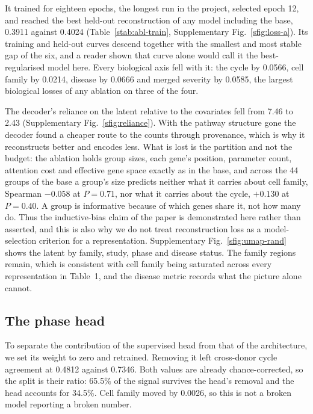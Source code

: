 It trained for eighteen epochs, the longest run in the project, selected
epoch 12, and reached the best held-out reconstruction of any model
including the base, 0.3911 against 0.4024 (Table~\ref{stab:abl-train},
Supplementary Fig.~\ref{sfig:loss-a}). Its training and held-out curves
descend together with the smallest and most stable gap of the six, and a
reader shown that curve alone would call it the best-regularised model
here. Every biological axis fell with it: the cycle by 0.0566, cell family
by 0.0214, disease by 0.0666 and merged severity by 0.0585, the largest
biological losses of any ablation on three of the four.

The decoder's reliance on the latent relative to the covariates fell from
7.46 to 2.43 (Supplementary Fig.~\ref{sfig:reliance}). With the pathway
structure gone the decoder found a cheaper route to the counts through
provenance, which is why it reconstructs better and encodes less. What is
lost is the partition and not the budget: the ablation holds group sizes,
each gene's position, parameter count, attention cost and effective gene
space exactly as in the base, and across the 44 groups of the base a
group's size predicts neither what it carries about cell family, Spearman
$-0.058$ at $P = 0.71$, nor what it carries about the cycle, $+0.130$ at
$P = 0.40$. A group is informative because of which genes share it, not
how many do. Thus the
inductive-bias claim of the paper is demonstrated here rather than
asserted, and this is also why we do not treat reconstruction loss as a
model-selection criterion for a representation. Supplementary
Fig.~\ref{sfig:umap-rand} shows the latent by family, study, phase and
disease status. The family regions remain, which is consistent with cell
family being saturated across every representation in Table~1, and the
disease metric records what the picture alone cannot.

\subsection{The phase head}

To separate the contribution of the supervised head from that of the
architecture, we set its weight to zero and retrained. Removing it left
cross-donor cycle agreement at 0.4812 against 0.7346. Both values are
already chance-corrected, so the split is their ratio: 65.5\% of the signal
survives the head's removal and the head accounts for 34.5\%. Cell family
moved by 0.0026, so this is not a broken model reporting a broken number.

